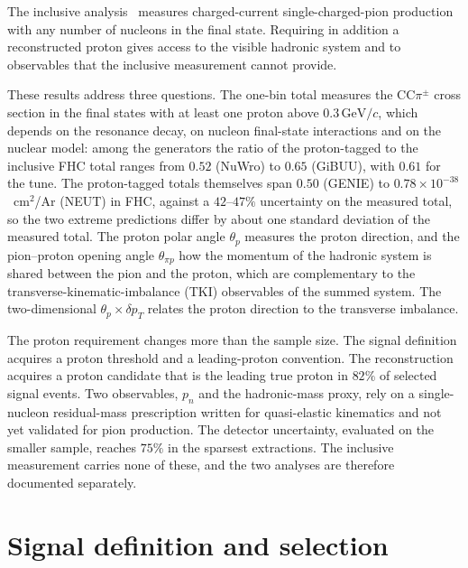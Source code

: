\documentclass[11pt,a4paper]{article}
\newcommand{\GeVc}{\,\text{GeV}\!/c}
\begin{document}
The inclusive analysis~\cite{incl_note} measures charged-current single-charged-pion production with
any number of nucleons in the final state. Requiring in addition a reconstructed proton gives access to
the  visible hadronic system and to observables that the inclusive measurement cannot provide.

These results address three questions. The one-bin total measures the CC$\pi^\pm$ cross
section in the final states with at least one proton above $0.3\GeVc$, which depends on the resonance
decay, on
nucleon final-state interactions and on the nuclear model: among the generators the ratio of the
proton-tagged to the inclusive FHC total ranges from $0.52$ (NuWro) to $0.65$ (GiBUU), with $0.61$ for
the tune. The proton-tagged totals themselves span $0.50$ (GENIE) to $0.78\times10^{-38}$~cm$^2$/Ar
(NEUT) in FHC, against a $42$--$47\%$ uncertainty on the measured total, so the two extreme predictions
differ by about one standard deviation of the measured total. The proton
polar angle $\theta_p$ measures the proton direction, and the pion--proton opening angle $\theta_{\pi p}$
how the momentum of the hadronic system is shared between the pion and the proton, which are complementary to the
transverse-kinematic-imbalance (TKI) observables of the summed system. The
two-dimensional $\theta_p\times\delta p_T$ relates the proton direction to the transverse imbalance.


%

The proton requirement changes more than the sample size. The signal definition acquires a proton
threshold and a leading-proton convention. The reconstruction acquires a proton candidate that is the
leading true proton in $82\%$ of selected signal events. Two observables, $p_n$ and the hadronic-mass
proxy, rely on a single-nucleon residual-mass prescription written for quasi-elastic kinematics and not
yet validated for pion production. The detector uncertainty, evaluated on the smaller sample, reaches
$75\%$ in the sparsest extractions. The inclusive measurement carries none of these, and the two
analyses are therefore documented separately. 

\section{Signal definition and selection}
\label{sec:pt_selection}
\label{sec:selection_1p}
\label{sec:wtki_cutflow}
\end{document}
